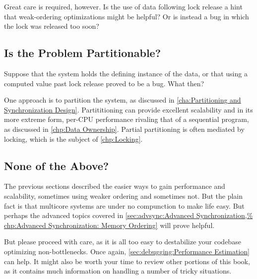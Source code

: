 Great care is required, however.
Is the use of data following lock release a hint that weak-ordering
optimizations might be helpful?
Or is instead a bug in which the lock was released too soon?

\subsection{Is the Problem Partitionable?}
\label{sec:app:questions:Is the Problem Partitionable?}

Suppose that the system holds the defining instance of the data,
or that using a computed value past lock release proved to be a bug.
What then?

One approach is to partition the system, as discussed in
\cref{cha:Partitioning and Synchronization Design}.
Partititioning can provide excellent scalability and in its more
extreme form, per-CPU performance rivaling that of a sequential program,
as discussed in \cref{chp:Data Ownership}.
Partial partitioning is often mediated by locking, which is the subject of
\cref{chp:Locking}.

\subsection{None of the Above?}
\label{sec:app:questions:None of the Above?}

The previous sections described the easier ways to gain performance
and scalability, sometimes using weaker ordering and sometimes not.
But the plain fact is that multicore systems are under no compunction
to make life easy.
But perhaps the advanced topics covered in
\cref{sec:advsync:Advanced Synchronization,%
chp:Advanced Synchronization: Memory Ordering}
will prove helpful.

But please proceed with care, as it is all too easy to destabilize
your codebase optimizing non-bottlenecks.
Once again, \cref{sec:debugging:Performance Estimation} can help.
It might also be worth your time to review other portions of this
book, as it contains much information on handling a number of tricky
situations.
